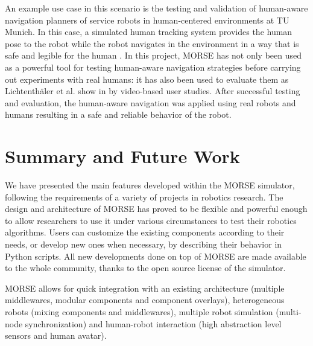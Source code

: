 \documentclass{llncs}
\newcommand{\serge}[1]{\nb{Serge}{blue}{#1}}
\begin{document}
An example use case in this scenario is the testing and validation of human-aware
navigation planners of service robots in human-centered environments at TU Munich.
In this case, a simulated human tracking system provides the human pose to the
robot while the robot navigates in the environment in a way that is safe and
legible for the human \cite{kruse10exploiting}. In this project, MORSE has not only been used as a
powerful tool for testing human-aware navigation strategies before carrying out
experiments with real humans: it has also been used to evaluate them as
Lichtenth{\"a}ler et al. show in \cite{lichtenthaeler2012increasing} by
video-based user studies. After successful testing and evaluation, the
human-aware navigation was applied using real robots and humans resulting in
a safe and reliable behavior of the robot.



\section{Summary and Future Work}
\label{section:discussion}

We have presented the main features developed within the MORSE simulator,
following the requirements of a variety of projects in robotics research.
The design and architecture of MORSE has proved to be flexible and powerful
enough to allow researchers to use it under various circumstances to test their
robotics algorithms. Users can customize the existing components according to
their needs, or develop new ones when necessary, by describing their behavior
in Python scripts.
All new developments done on top of MORSE are made available to the whole
community, thanks to the open source license of the simulator.

MORSE allows for quick integration with an existing architecture (multiple
middlewares, modular components and component overlays), heterogeneous robots
(mixing components and middlewares), multiple robot simulation (multi-node
synchronization) and human-robot interaction (high abstraction level sensors
and human avatar).
\end{document}
